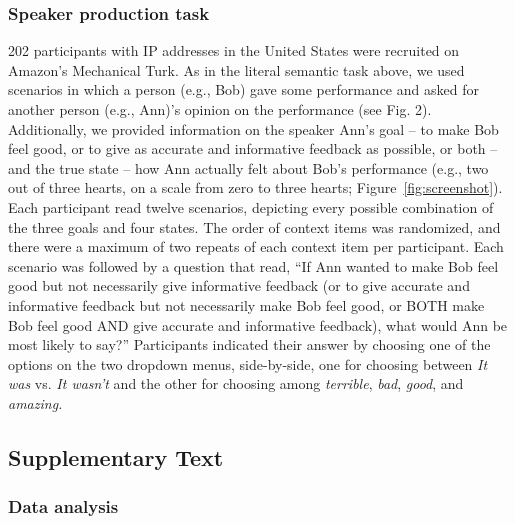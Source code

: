 \documentclass[12pt]{article}
\begin{document}
\subsubsection*{Speaker production task}\label{speaker-production-task}

202 participants with IP addresses in the United States were recruited
on Amazon's Mechanical Turk. As in the literal semantic task above, we
used scenarios in which a person (e.g., Bob) gave some performance and
asked for another person (e.g., Ann)'s opinion on the performance (see
Fig. 2). Additionally, we provided information on the speaker Ann's goal
-- to make Bob feel good, or to give as accurate and informative
feedback as possible, or both -- and the true state -- how Ann actually
felt about Bob's performance (e.g., two out of three hearts, on a scale
from zero to three hearts; Figure~\ref{fig:screenshot}). Each
participant read twelve scenarios, depicting every possible combination
of the three goals and four states. The order of context items was
randomized, and there were a maximum of two repeats of each context item
per participant. Each scenario was followed by a question that read,
\enquote{If Ann wanted to make Bob feel good but not necessarily give
informative feedback (or to give accurate and informative feedback but
not necessarily make Bob feel good, or BOTH make Bob feel good AND give
accurate and informative feedback), what would Ann be most likely to
say?} Participants indicated their answer by choosing one of the options
on the two dropdown menus, side-by-side, one for choosing between
\emph{It was} vs. \emph{It wasn't} and the other for choosing among
\emph{terrible}, \emph{bad}, \emph{good}, and \emph{amazing.}

\subsection*{Supplementary Text}\label{supplementary-text}

\subsubsection*{Data analysis}\label{data-analysis}
\end{document}

